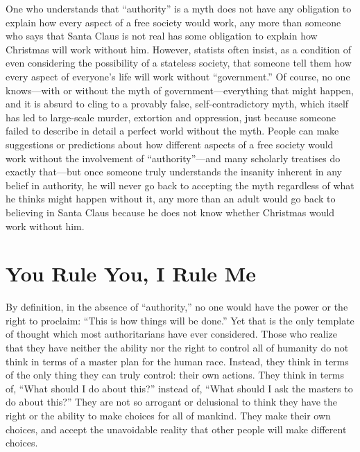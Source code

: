 \documentclass{book}
\begin{document}
One who understands that \enquote{authority} is a myth does not have any obligation to explain how every aspect of a free society would work, any more than someone who says that Santa Claus is not real has some obligation to explain how Christmas will work without him. However, statists often insist, as a condition of even considering the possibility of a stateless society, that someone tell them how every aspect of everyone's life will work without \enquote{government.} Of course, no one knows---with or without the myth of government---everything that might happen, and it is absurd to cling to a provably false, self-contradictory myth, which itself has led to large-scale murder, extortion and oppression, just because someone failed to describe in detail a perfect world without the myth. People can make suggestions or predictions about how different aspects of a free society would work without the involvement of \enquote{authority}---and many scholarly treatises do exactly that---but once someone truly understands the insanity inherent in any belief in authority, he will never go back to accepting the myth regardless of what he thinks might happen without it, any more than an adult would go back to believing in Santa Claus because he does not know whether Christmas would work without him.

\section{You Rule You, I Rule Me}

By definition, in the absence of \enquote{authority,} no one would have the power or the right to proclaim: \enquote{This is how things will be done.} Yet that is the only template of thought which most authoritarians have ever considered. Those who realize that they have neither the ability nor the right to control all of humanity do not think in terms of a master plan for the human race. Instead, they think in terms of the only thing they can truly control: their own actions. They think in terms of, \enquote{What should I do about this?} instead of, \enquote{What should I ask the masters to do about this?} They are not so arrogant or delusional to think they have the right or the ability to make choices for all of mankind. They make their own choices, and accept the unavoidable reality that other people will make different choices.
\end{document}
